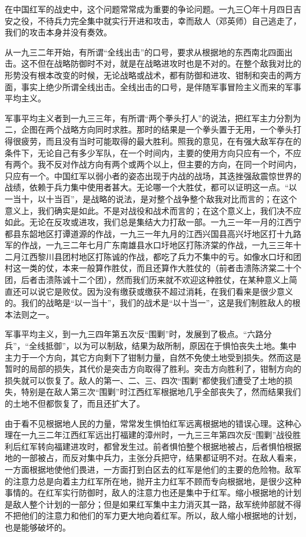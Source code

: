在中国红军的战史中，这个问题常常成为重要的争论问题。一九三〇年十月四日吉安之役，不待兵力完全集中就实行开进和攻击，幸而敌人（邓英师）自己逃走了，我们的攻击本身并没有奏效。

从一九三二年开始，有所谓“全线出击”的口号，要求从根据地的东西南北四面出击。这不但在战略防御时不对，就是在战略进攻时也是不对的。在整个敌我对比的形势没有根本改变的时候，无论战略或战术，都有防御和进攻、钳制和突击的两方面，事实上绝少所谓全线出击。全线出击的口号，是伴随军事冒险主义而来的军事平均主义。

军事平均主义者到一九三三年，有所谓“两个拳头打人”的说法，把红军主力分割为二，企图在两个战略方向同时求胜。那时的结果是一个拳头置于无用，一个拳头打得很疲劳，而且没有当时可能取得的最大胜利。照我的意见，在有强大敌军存在的条件下，无论自己有多少军队，在一个时间内，主要的使用方向只应有一个，不应有两个。我不反对作战方向有两个或两个以上，但主要的方向，在同一个时间内，只应有一个。中国红军以弱小者的姿态出现于内战的战场，其迭挫强敌震惊世界的战绩，依赖于兵力集中使用者甚大。无论哪一个大胜仗，都可以证明这一点。“以一当十，以十当百”，是战略的说法，是对整个战争整个敌我对比而言的；在这个意义上，我们确实是如此。不是对战役和战术而言的；在这个意义上，我们决不应如此。无论在反攻或进攻，我们总是集结大力打敌一部。一九三一年一月的江西宁都县东韶地区打谭道源的作战，一九三一年九月的江西兴国县高兴圩地区打十九路军的作战，一九三二年七月广东南雄县水口圩地区打陈济棠的作战，一九三三年十二月江西黎川县团村地区打陈诚的作战，都吃了兵力不集中的亏。如像水口圩和团村这一类的仗，本来一般算作胜仗，而且还算作大胜仗的（前者击溃陈济棠二十个团，后者击溃陈诚十二个团），然而我们历来就不欢迎这种胜仗，在某种意义上简直还可以说它是败仗。因为没有缴获或缴获不超过消耗，在我们看来是很少意义的。我们的战略是“以一当十”，我们的战术是“以十当一”，这是我们制胜敌人的根本法则之一。

军事平均主义，到一九三四年第五次反“围剿”时，发展到了极点。“六路分兵”，“全线抵御”，以为可以制敌，结果为敌所制，原因在于惧怕丧失土地。集中主力于一个方向，其它方向剩下了钳制力量，自然不免使土地受到损失。然而这是暂时的局部的损失，其代价是突击方向取得了胜利。突击方向胜利了，钳制方向的损失就可以恢复了。敌人的第一、二、三、四次“围剿”都使我们遭受了土地的损失，特别是在敌人第三次“围剿”时江西红军根据地几乎全部丧失了，然而结果我们的土地不但都恢复了，而且还扩大了。

由于看不见根据地人民的力量，常常发生惧怕红军远离根据地的错误心理。这种心理在一九三二年江西红军远出打福建的漳州时，一九三三年第四次反“围剿”战役胜利后红军转向福建进攻时，都曾发生过。前者惧怕整个根据地被占，后者惧怕根据地的一部被占，而反对集中兵力，主张分兵把守，结果都证明不对。在敌人看来，一方面根据地使他们畏进，一方面打到白区去的红军是他们的主要的危险物。敌军的注意力总是向着主力红军所在地，抛开主力红军不顾而专向根据地，是很少这种事情的。在红军实行防御时，敌人的注意力也还是集中于红军。缩小根据地的计划是敌人整个计划的一部分；但是如果红军集中主力消灭其一路，敌军统帅部就不得不把他们的注意力和他们的军力更大地向着红军。所以，敌人缩小根据地的计划，也是能够破坏的。

